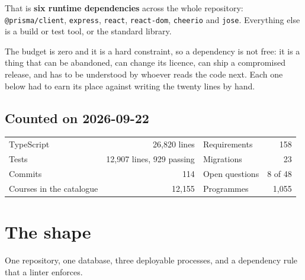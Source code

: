 \documentclass[11pt,a4paper]{article}
\begin{document}
\vspace{1em}

That is \textbf{six runtime dependencies} across the whole repository:
\texttt{@prisma/client}, \texttt{express}, \texttt{react},
\texttt{react-dom}, \texttt{cheerio} and \texttt{jose}. Everything else is
a build or test tool, or the standard library.

\begin{why}
The budget is zero and it is a hard constraint, so a dependency is not free:
it is a thing that can be abandoned, can change its licence, can ship a
compromised release, and has to be understood by whoever reads the code next.
Each one below had to earn its place against writing the twenty lines by hand.
\end{why}

\subsection{Counted on 2026-09-22}

\begin{center}
\sffamily\small
\begin{tabular}{@{}l r l r@{}}
\toprule
TypeScript & 26{,}820 lines & Requirements & 158 \\
Tests & 12{,}907 lines, 929 passing & Migrations & 23 \\
Commits & 114 & Open questions & 8 of 48 \\
Courses in the catalogue & 12{,}155 & Programmes & 1{,}055 \\
\bottomrule
\end{tabular}
\end{center}

\newpage
\section{The shape}

One repository, one database, three deployable processes, and a dependency
rule that a linter enforces.

\begin{center}
\end{center}
\end{document}

